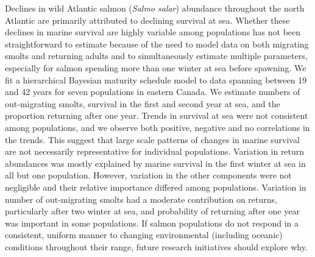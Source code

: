 \documentclass[12pt]{article}
\newcommand{\So}{$S_{1}$\xspace}
\newcommand{\St}{$S_{2}$\xspace}
\newcommand{\Pg}{$P_g$\xspace}
\begin{document}
Declines in wild Atlantic salmon (\emph{Salmo salar}) abundance throughout the north
Atlantic are primarily attributed to declining survival at sea. 
Whether these declines in marine survival are highly variable among populations
has not been straightforward to estimate because of
the need to model data on both migrating smolts and returning adults and to
simultaneously estimate multiple parameters, especially for salmon spending
more than one winter at sea before spawning. We fit a hierarchical Bayesian
maturity schedule model to data spanning between 19 and 42 years for seven populations in eastern 
Canada. We estimate numbers of out-migrating smolts, 
survival in the first and second year at sea, and the proportion returning after one year. 
Trends in survival at sea were not consistent among populations, and we observe both
positive, negative and no correlations in the trends. This suggest that large
scale patterns of changes in marine survival are not necessarily representative for
individual populations. 
Variation in return abundances was mostly explained by marine survival in the
first winter at sea in all but one population.
However, variation in the other components were not negligible and
their relative importance differed among populations. Variation in number of
out-migrating smolts had a moderate contribution on returns, particularly
after two winter at sea, and probability of returning after one year was
important in some populations. 
If salmon populations do not respond in a consistent, uniform manner to
changing environmental (including oceanic) conditions throughout their range,
future research initiatives should explore why.
\end{document}
